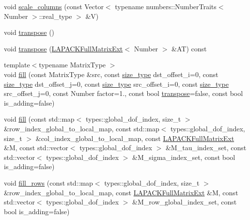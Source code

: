 \begin{DoxyCompactItemize}
\item 
void \hyperlink{classLAPACKFullMatrixExt_ab6e19be9ab53b4a38ba0d47a3b5f3daa}{scale\+\_\+columns} (const Vector$<$ typename numbers\+::\+Number\+Traits$<$ Number $>$\+::real\+\_\+type $>$ \&V)
\item 
void \hyperlink{classLAPACKFullMatrixExt_ac46d71bc1b0288fce7ad44b222e9210b}{transpose} ()
\item 
void \hyperlink{classLAPACKFullMatrixExt_a12a95aeff6e93f0284c59cffd0fb7b8e}{transpose} (\hyperlink{classLAPACKFullMatrixExt}{L\+A\+P\+A\+C\+K\+Full\+Matrix\+Ext}$<$ Number $>$ \&AT) const
\item 
{\footnotesize template$<$typename Matrix\+Type $>$ }\\void \hyperlink{classLAPACKFullMatrixExt_ada3ff3d40049aca2c4d554baa701d613}{fill} (const Matrix\+Type \&src, const \hyperlink{classLAPACKFullMatrixExt_a5cf5f4a6104dc17029210b5ca52bf574}{size\+\_\+type} dst\+\_\+offset\+\_\+i=0, const \hyperlink{classLAPACKFullMatrixExt_a5cf5f4a6104dc17029210b5ca52bf574}{size\+\_\+type} dst\+\_\+offset\+\_\+j=0, const \hyperlink{classLAPACKFullMatrixExt_a5cf5f4a6104dc17029210b5ca52bf574}{size\+\_\+type} src\+\_\+offset\+\_\+i=0, const \hyperlink{classLAPACKFullMatrixExt_a5cf5f4a6104dc17029210b5ca52bf574}{size\+\_\+type} src\+\_\+offset\+\_\+j=0, const Number factor=1., const bool \hyperlink{classLAPACKFullMatrixExt_ac46d71bc1b0288fce7ad44b222e9210b}{transpose}=false, const bool is\+\_\+adding=false)
\item 
void \hyperlink{classLAPACKFullMatrixExt_a3f0dffff13babd0b952a821b5f1f23c9}{fill} (const std\+::map$<$ types\+::global\+\_\+dof\+\_\+index, size\+\_\+t $>$ \&row\+\_\+index\+\_\+global\+\_\+to\+\_\+local\+\_\+map, const std\+::map$<$ types\+::global\+\_\+dof\+\_\+index, size\+\_\+t $>$ \&col\+\_\+index\+\_\+global\+\_\+to\+\_\+local\+\_\+map, const \hyperlink{classLAPACKFullMatrixExt}{L\+A\+P\+A\+C\+K\+Full\+Matrix\+Ext} \&M, const std\+::vector$<$ types\+::global\+\_\+dof\+\_\+index $>$ \&M\+\_\+tau\+\_\+index\+\_\+set, const std\+::vector$<$ types\+::global\+\_\+dof\+\_\+index $>$ \&M\+\_\+sigma\+\_\+index\+\_\+set, const bool is\+\_\+adding=false)
\item 
void \hyperlink{classLAPACKFullMatrixExt_a73e9ad59ab56c377edc852d8ba16995c}{fill\+\_\+rows} (const std\+::map$<$ types\+::global\+\_\+dof\+\_\+index, size\+\_\+t $>$ \&row\+\_\+index\+\_\+global\+\_\+to\+\_\+local\+\_\+map, const \hyperlink{classLAPACKFullMatrixExt}{L\+A\+P\+A\+C\+K\+Full\+Matrix\+Ext} \&M, const std\+::vector$<$ types\+::global\+\_\+dof\+\_\+index $>$ \&M\+\_\+row\+\_\+global\+\_\+index\+\_\+set, const bool is\+\_\+adding=false)

\end{DoxyCompactItemize}
